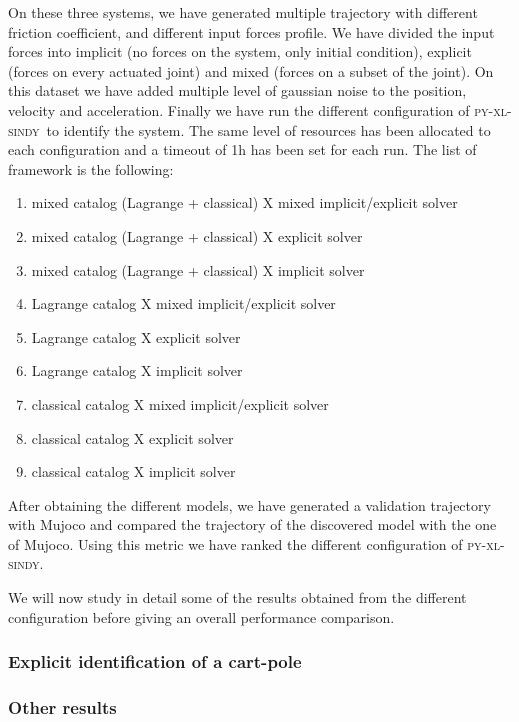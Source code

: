 \documentclass[12pt]{article}
\newcommand{\frameworkname}{\textsc{py-xl-sindy}}
\begin{document}
On these three systems, we have generated multiple trajectory with different friction coefficient, and different input forces profile. We have divided the input forces into implicit (no forces on the system, only initial condition), explicit (forces on every actuated joint) and mixed (forces on a subset of the joint). 
On this dataset we have added multiple level of gaussian noise to the position, velocity and acceleration. Finally we have run the different configuration of \frameworkname\ to identify the system. The same level of resources has been allocated to each configuration and a timeout of 1h has been set for each run.
The list of framework is the following: 
\begin{enumerate}
	\item mixed catalog (Lagrange + classical) X mixed implicit/explicit solver
	\item mixed catalog (Lagrange + classical) X explicit solver
	\item mixed catalog (Lagrange + classical) X implicit solver
	\item Lagrange catalog X mixed implicit/explicit solver
	\item Lagrange catalog X explicit solver
	\item Lagrange catalog X implicit solver
	\item classical catalog X mixed implicit/explicit solver
	\item classical catalog X explicit solver
	\item classical catalog X implicit solver 
\end{enumerate}

After obtaining the different models, we have generated a validation trajectory with Mujoco and compared the trajectory of the discovered model with the one of Mujoco. Using this metric we have ranked the different configuration of \frameworkname.

We will now study in detail some of the results obtained from the different configuration before giving an overall performance comparison.

\subsubsection*{Explicit identification of a cart-pole}


\subsubsection*{Other results}
\end{document}
